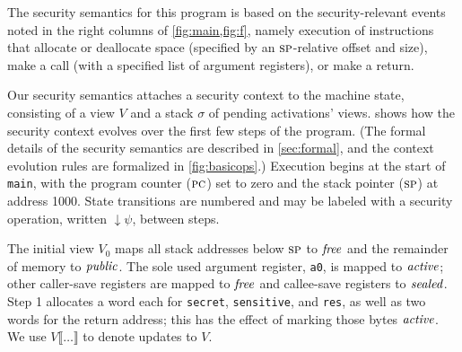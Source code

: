 \documentclass[10pt,conference]{ieeetran}%
\theoremstyle{definition}
\begin{document}
The security semantics for this program is based
on the security-relevant events noted in the right columns of \cref{fig:main,fig:f},
namely execution of instructions that allocate or deallocate space (specified by
an \(\textsc{sp}\)-relative offset and size), make a call (with a specified list of argument registers),
or make a return.

Our security semantics attaches a security context to the machine state,
consisting of a view \(V\) and a stack \(\sigma\) of pending activations' views.
 shows how the security context evolves over the first few
steps of the program.  (The formal details of the security semantics are described in
\cref{sec:formal}, and the context evolution rules are formalized in \cref{fig:basicops}.)
Execution begins at the start of {\tt main}, with the program counter
(\(\textsc{pc}\)) set to zero and the stack pointer (\(\textsc{sp}\)) at address 1000.
State transitions are numbered and may be labeled with a security operation, written
\(\downarrow \psi\), between steps.

The initial view \(V_0\) maps all stack addresses below \(\textsc{sp}\) to \(\mathit{free}\) and the remainder of
memory to \(\mathit{public}\). The sole used argument register, {\tt a0}, is mapped to \(\mathit{active}\);
other caller-save registers are mapped to \(\mathit{free}\) and callee-save registers to \(\mathit{sealed}\).
Step 1 allocates a word each for {\tt secret}, {\tt sensitive}, and {\tt res}, as well
as two words for the return address; this has the
effect of marking those bytes \(\mathit{active}\).
We use \(V\llbracket\ldots\rrbracket\) to denote updates to \(V\).
\end{document}
